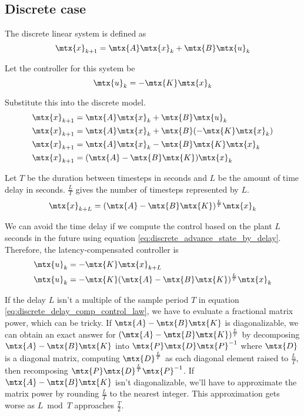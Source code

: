 \subsection{Discrete case}

The discrete linear system is defined as
\begin{equation*}
  \mtx{x}_{k+1} = \mtx{A}\mtx{x}_k + \mtx{B}\mtx{u}_k
\end{equation*}

Let the controller for this system be
\begin{equation*}
  \mtx{u}_k = -\mtx{K}\mtx{x}_k
\end{equation*}

Substitute this into the discrete model.
\begin{align*}
  \mtx{x}_{k+1} &= \mtx{A}\mtx{x}_k + \mtx{B}\mtx{u}_k \\
  \mtx{x}_{k+1} &= \mtx{A}\mtx{x}_k + \mtx{B}(-\mtx{K}\mtx{x}_k) \\
  \mtx{x}_{k+1} &= \mtx{A}\mtx{x}_k - \mtx{B}\mtx{K}\mtx{x}_k \\
  \mtx{x}_{k+1} &= (\mtx{A} - \mtx{B}\mtx{K}) \mtx{x}_k
\end{align*}

Let $T$ be the duration between timesteps in seconds and $L$ be the amount of
time delay in seconds. $\frac{L}{T}$ gives the number of timesteps represented
by $L$.
\begin{equation}
  \mtx{x}_{k+L} = (\mtx{A} - \mtx{B}\mtx{K})^\frac{L}{T} \mtx{x}_k
    \label{eq:discrete_advance_state_by_delay}
\end{equation}

We can avoid the time delay if we compute the control based on the plant $L$
seconds in the future using equation \eqref{eq:discrete_advance_state_by_delay}.
Therefore, the latency-compensated controller is
\begin{align}
  \mtx{u}_k &= -\mtx{K}\mtx{x}_{k+L} \nonumber \\
  \mtx{u}_k &= -\mtx{K} (\mtx{A} - \mtx{B}\mtx{K})^\frac{L}{T} \mtx{x}_k
    \label{eq:discrete_delay_comp_control_law}
\end{align}

If the delay $L$ isn't a multiple of the sample period $T$ in equation
\eqref{eq:discrete_delay_comp_control_law}, we have to evaluate a fractional
matrix power, which can be tricky. If $\mtx{A} - \mtx{B}\mtx{K}$ is
diagonalizable, we can obtain an exact answer for
$(\mtx{A} - \mtx{B}\mtx{K})^\frac{L}{T}$ by decomposing
$\mtx{A} - \mtx{B}\mtx{K}$ into $\mtx{P}\mtx{D}\mtx{P}^{-1}$ where $\mtx{D}$ is
a diagonal matrix, computing $\mtx{D}^\frac{L}{T}$ as each diagonal element
raised to $\frac{L}{T}$, then recomposing
$\mtx{P}\mtx{D}^\frac{L}{T}\mtx{P}^{-1}$. If $\mtx{A} - \mtx{B}\mtx{K}$ isn't
diagonalizable, we'll have to approximate the matrix power by rounding
$\frac{L}{T}$ to the nearest integer. This approximation gets worse as
$L \bmod T$ approaches $\frac{T}{2}$.
